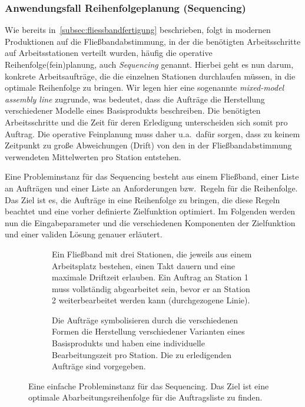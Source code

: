 \subsubsection{Anwendungsfall Reihenfolgeplanung (Sequencing)}\label{subsubsec:anwendungsfall-reihenfolgeplanung}
Wie bereits in~\cref{subsec:fliessbandfertigung} beschrieben,
folgt in modernen Produktionen auf die Fließbandabstimmung,
in der die benötigten Arbeitsschritte auf Arbeitsstationen verteilt wurden,
häufig die operative Reihenfolge(fein)planung, auch \emph{Sequencing} genannt.
Hierbei geht es nun darum, konkrete Arbeitsaufträge,
die die einzelnen Stationen durchlaufen müssen, in die optimale Reihenfolge zu bringen.
Wir legen hier eine sogenannte \emph{mixed-model assembly line} zugrunde,
was bedeutet, dass die Aufträge die Herstellung verschiedener Modelle eines Basisprodukts beschreiben.
Die benötigten Arbeitsschritte und die Zeit für deren Erledigung unterscheiden sich somit pro Auftrag.
Die operative Feinplanung muss daher u.a.\ dafür sorgen, dass zu keinem Zeitpunkt zu große Abweichungen (Drift)
von den in der Fließbandabstimmung verwendeten Mittelwerten pro Station entstehen.

Eine Probleminstanz für das Sequencing besteht aus
einem Fließband, einer Liste an Aufträgen und einer Liste an Anforderungen bzw.\ Regeln für die Reihenfolge.
Das Ziel ist es, die Aufträge in eine Reihenfolge zu bringen, die diese Regeln beachtet und eine vorher definierte Zielfunktion optimiert.
Im Folgenden werden nun die Eingabeparameter und die verschiedenen Komponenten der Zielfunktion und einer validen Lösung genauer erläutert.

\begin{figure}[H]
    \begin{subfigure}[c]{0.48\textwidth}
        \centering
        \caption{%
        \label{fig:sequencing_assembly_line}
        Ein Fließband mit drei Stationen,
            die jeweils aus einem Arbeitsplatz bestehen,
            einen Takt dauern
            und eine maximale Driftzeit erlauben.
        Ein Auftrag an Station 1 muss vollständig abgearbeitet sein,
            bevor er an Station 2 weiterbearbeitet werden kann (durchgezogene Linie).
        }
    \end{subfigure}%
    \hfill
    \begin{subfigure}[c]{0.48\textwidth}
        \centering
        \caption{%
        \label{fig:sequencing_auftraege}
        Die Aufträge symbolisieren durch die verschiedenen Formen
        die Herstellung verschiedener Varianten eines Basisprodukts
        und haben eine individuelle Bearbeitungszeit pro Station.
        Die zu erledigenden Aufträge sind vorgegeben.
        }
    \end{subfigure}
    \caption{%
        \label{fig:sequencing_instance}
        Eine einfache Probleminstanz für das Sequencing.
        Das Ziel ist eine optimale Abarbeitungsreihenfolge für die Auftragsliste zu finden.
    }
\end{figure}

